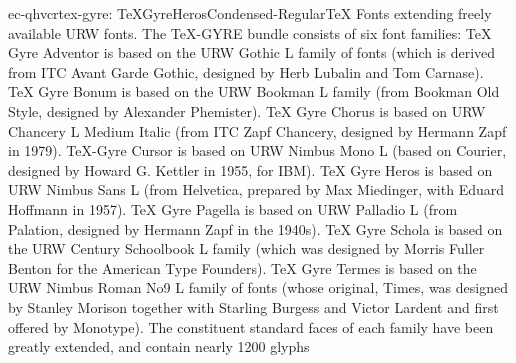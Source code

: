 \documentclass{ddltxtyp}
\begin{document}
\begin{package}{ec-qhvcr}{tex-gyre: TeXGyreHerosCondensed-Regular}{{\TeX} Fonts extending freely available URW fonts.}
The {\TeX}-GYRE bundle consists of six font families: {\TeX} Gyre
Adventor is based on the URW Gothic L family of fonts (which is
derived from ITC Avant Garde Gothic, designed by Herb Lubalin
and Tom Carnase). {\TeX} Gyre Bonum is based on the URW Bookman L
family (from Bookman Old Style, designed by Alexander
Phemister). {\TeX} Gyre Chorus is based on URW Chancery L Medium
Italic (from ITC Zapf Chancery, designed by Hermann Zapf in
1979). {\TeX}-Gyre Cursor is based on URW Nimbus Mono L (based on
Courier, designed by Howard G. Kettler in 1955, for IBM). {\TeX}
Gyre Heros is based on URW Nimbus Sans L (from Helvetica,
prepared by Max Miedinger, with Eduard Hoffmann in 1957). {\TeX}
Gyre Pagella is based on URW Palladio L (from Palation,
designed by Hermann Zapf in the 1940s). {\TeX} Gyre Schola is
based on the URW Century Schoolbook L family (which was
designed by Morris Fuller Benton for the American Type
Founders). {\TeX} Gyre Termes is based on the URW Nimbus Roman No9
L family of fonts (whose original, Times, was designed by
Stanley Morison together with Starling Burgess and Victor
Lardent and first offered by Monotype). The constituent
standard faces of each family have been greatly extended, and
contain nearly 1200 glyphs %
\end{package}
\end{document}
